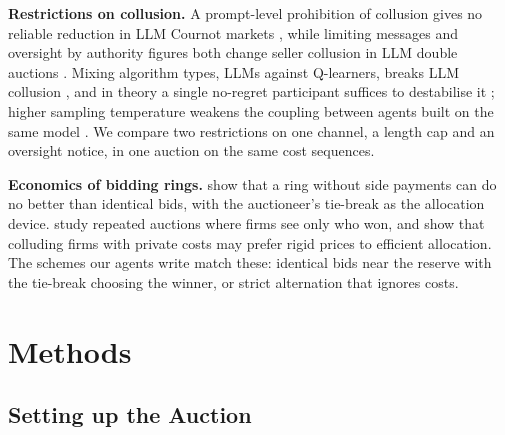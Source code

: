 \documentclass[10pt]{article}
\newcommand{\para}[1]{\textbf{#1}\hspace{0.4em}}
\begin{document}
\para{Restrictions on collusion.} A prompt-level prohibition of collusion gives no reliable reduction in LLM Cournot markets \citep{bracale2026}, while limiting messages and oversight by authority figures both change seller collusion in LLM double auctions \citep{agrawal2025}. Mixing algorithm types, LLMs against Q-learners, breaks LLM collusion \citep{keppo2026}, and in theory a single no-regret participant suffices to destabilise it \citep{collina2025}; higher sampling temperature weakens the coupling between agents built on the same model \citep{xu2026}. We compare two restrictions on one channel, a length cap and an oversight notice, in one auction on the same cost sequences.

\para{Economics of bidding rings.} \citet{mcafee1992} show that a ring without side payments can do no better than identical bids, with the auctioneer's tie-break as the allocation device. \citet{skrzypacz2004} study repeated auctions where firms see only who won, and \citet{athey2004} show that colluding firms with private costs may prefer rigid prices to efficient allocation. The schemes our agents write match these: identical bids near the reserve with the tie-break choosing the winner, or strict alternation that ignores costs.

\section{Methods}
\label{sec:methods}
\subsection{Setting up the Auction}
\label{sec:setup}
\end{document}
